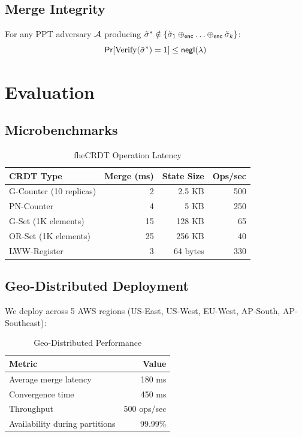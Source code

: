 \documentclass{../shared/luxfhe}
\begin{document}
\subsection{Merge Integrity}

\begin{theorem}
For any PPT adversary $\mathcal{A}$ producing $\tilde{\sigma}^* \notin \{\tilde{\sigma}_1 \oplus_{\mathsf{enc}} \ldots \oplus_{\mathsf{enc}} \tilde{\sigma}_k\}$:
\[
\mathsf{Pr}[\text{Verify}(\tilde{\sigma}^*) = 1] \leq \mathsf{negl}(\lambda)
\]
\end{theorem}

\section{Evaluation}

\subsection{Microbenchmarks}

\begin{table}[h]
\centering
\caption{fheCRDT Operation Latency}
\begin{tabular}{lrrr}
\toprule
CRDT Type & Merge (ms) & State Size & Ops/sec \\
\midrule
G-Counter (10 replicas) & 2 & 2.5 KB & 500 \\
PN-Counter & 4 & 5 KB & 250 \\
G-Set (1K elements) & 15 & 128 KB & 65 \\
OR-Set (1K elements) & 25 & 256 KB & 40 \\
LWW-Register & 3 & 64 bytes & 330 \\
\bottomrule
\end{tabular}
\end{table}

\subsection{Geo-Distributed Deployment}

We deploy across 5 AWS regions (US-East, US-West, EU-West, AP-South, AP-Southeast):

\begin{table}[h]
\centering
\caption{Geo-Distributed Performance}
\begin{tabular}{lr}
\toprule
Metric & Value \\
\midrule
Average merge latency & 180 ms \\
Convergence time & 450 ms \\
Throughput & 500 ops/sec \\
Availability during partitions & 99.99\% \\
\bottomrule
\end{tabular}
\end{table}
\end{document}
